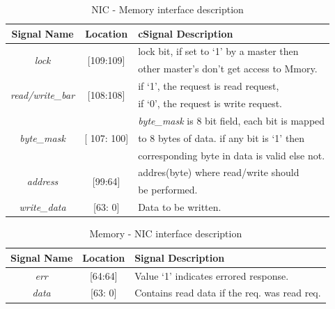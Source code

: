 \documentclass[12pt]{report}
\begin{document}
				\begin{table}[!htbp]
					\centering
					\begin{tabular}{ccl}
						\hline
						\textbf{Signal Name} 			& \textbf{Location} 		&{c}\textbf{Signal Description}  \\ \hline
						\multirow{2}{*}{\textit{lock}}		& \multirow{2}{*}{[109:109]}	& lock bit, if set to `1' by a master then\\
											&				& other master's don't get access to Mmory.\\ \hline
						\multirow{2}{*}{\textit{read/write\_bar}}& \multirow{2}{*}{[108:108]}	& if `1', the request is read request,\\ 
											& 				& if `0', the request is write request.\\ \hline
						\multirow{3}{*}{\textit{byte\_mask}}	& \multirow{3}{*}{[ 107: 100]}	& \textit{byte\_mask} is 8 bit field, each bit is mapped\\
											&				& to 8 bytes of data. if any bit is `1' then\\
											& 				& corresponding byte in data is valid else not.\\ \hline 
						\multirow{2}{*}{\textit{address}}   	& \multirow{2}{*}{[99:64]} 	& addres(byte) where read/write should\\ 
											&				& be performed.\\ \hline
						\textit{write\_data}   			& [63: 0] 			& Data to be written.\\ \hline
					\end{tabular}
					\caption{NIC - Memory interface description}
					\label{tab:NIC-Memory-interface-req}
				\end{table}

				\begin{table}[!htbp]
					\centering
					\begin{tabular}{ccl}
						\hline
						\textbf{Signal Name} 		& \textbf{Location} 		&\textbf{Signal Description}  \\ \hline
						\textit{err}			& [64:64]			& Value `1' indicates errored response.\\\hline
						\textit{data}   		& [63: 0] 			& Contains read data if the req. was read req.\\ \hline
					\end{tabular}
					\caption{Memory - NIC interface description}
					\label{tab:Memory-NIC-interface-resp}
				\end{table}
			
\end{document}
